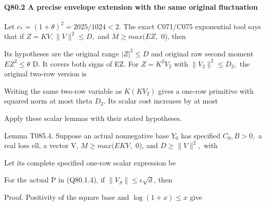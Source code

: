 \paragraph{Q80.2 A precise envelope extension with the same original fluctuation}\label{part:Q80.2}

Let \(c_*=(1+\theta)^2=2025/1024<2.\) The exact C071/C075 exponential
tool says that if \(Z=KV,\allowbreak  \lVert V\rVert ^2\le D,\allowbreak \) and \(M\ge max(EZ,\allowbreak \) 0), then


Its hypotheses are the original range \(|Z|^2\le D\) and original raw
second moment \(EZ^2\le \theta\) D. It covers both signs of EZ.
For \(Z=K^2V_2\) with \(\lVert V_2\rVert ^2\le D_2,\allowbreak \) the original two-row version is


Writing the same two-row variable as \(K(KV_2)\) gives a one-row
primitive with squared norm at most theta \(D_2.\) Its scalar cost
increases by at most


Apply these scalar lemmas with their stated hypotheses.

Lemma T085.4. Suppose an actual nonnegative base \(Y_0\) has specified
\(C_0,\allowbreak  B>0,\allowbreak \) a real loss ell, a vector V, \(M\ge max(EKV,\allowbreak \) 0), and \(D\ge \lVert V\rVert ^2,\allowbreak \)
with


Let its complete specified one-row scalar expression be


For the actual P in (Q80.1.4), if \(\lVert V_S\rVert \le \epsilon \sqrt{d}\), then


Proof. Positivity of the square base and \(\log(1+x)\le x\) give


